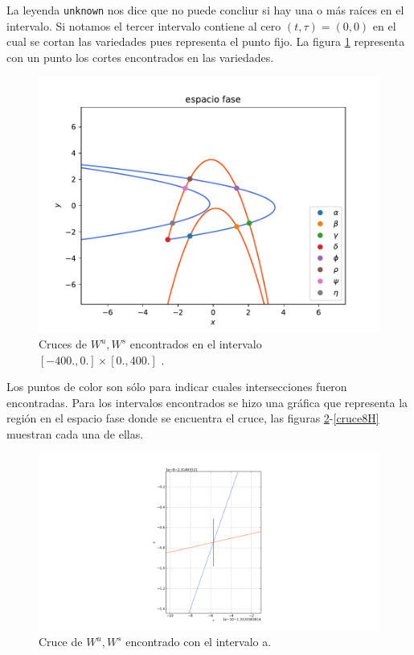 La leyenda \texttt{unknown} nos dice que no puede concliur si hay una o más raíces en el intervalo. Si notamos el tercer intervalo contiene al cero $(t,\tau)=(0,0)$ en el cual se cortan las variedades pues representa el punto fijo. La figura \ref{crucesH} representa con un punto los cortes encontrados en las variedades.
\begin{figure}[H]
\centering
\includegraphics[scale=0.5]{crucesL}
\caption{Cruces de $W^{u},W^{s}$ encontrados en el intervalo $[-400.,0.] \times [0.,400.]$ .}
\label{crucesH}
\end{figure}
Los puntos de color son sólo para indicar cuales intersecciones fueron encontradas. Para los intervalos encontrados se hizo una gráfica que representa la región en el espacio fase donde se encuentra el cruce, las figuras \ref{cruce1H}-\ref{cruce8H} muestran cada una de ellas.

\begin{figure}[H]
\centering
\includegraphics[scale=0.4]{cruce1}
\caption{Cruce de $W^{u},W^{s}$ encontrado con el intervalo a.}
\label{cruce1H}
\end{figure}

